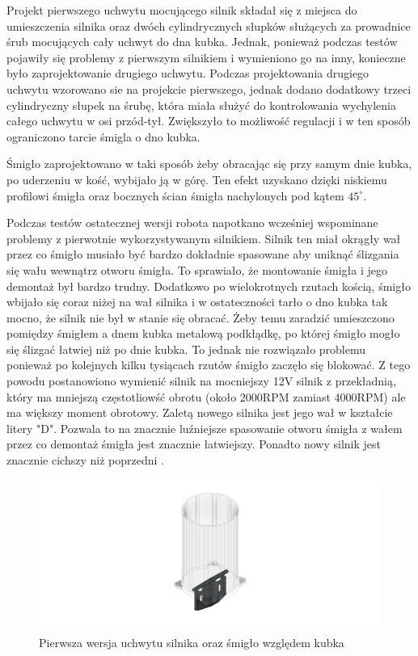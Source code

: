 Projekt pierwszego uchwytu mocującego silnik składał się z miejsca do umieszczenia silnika oraz dwóch cylindrycznych słupków służących za prowadnice
śrub mocujących cały uchwyt do dna kubka. Jednak, ponieważ podczas testów pojawiły się problemy z pierwszym silnikiem i wymieniono go na inny, konieczne
było zaprojektowanie drugiego uchwytu. Podczas projektowania drugiego uchwytu wzorowano sie na projekcie pierwszego, jednak dodano dodatkowy trzeci
cylindryczny słupek na śrubę, która miała służyć do kontrolowania wychylenia całego uchwytu w osi przód-tył. Zwiększyło to możliwość regulacji i w ten sposób
ograniczono tarcie śmigla o dno kubka. 

Śmigło zaprojektowano w taki sposób żeby obracając się przy samym dnie kubka, po uderzeniu w kość, wybijało ją w górę. Ten efekt uzyskano
dzięki niskiemu profilowi śmigła oraz bocznych ścian śmigła nachylonych pod kątem $45^{\circ}$.

Podczas testów ostatecznej wersji robota napotkano wcześniej wspominane problemy z pierwotnie wykorzystywanym silnikiem. Silnik ten miał okrągły wał przez co śmigło musiało
być bardzo dokładnie spasowane aby uniknąć ślizgania się wału wewnątrz otworu śmigła. To sprawiało, że montowanie śmigła i jego demontaż był bardzo trudny. Dodatkowo po wielokrotnych rzutach kością, śmigło
wbijało się coraz niżej na wał silnika i w ostateczności tarło o dno kubka tak mocno, że silnik nie był w stanie się obracać. 
Żeby temu zaradzić umieszczono pomiędzy śmigłem a dnem kubka metalową podkłądkę, po której śmigło mogło się ślizgać łatwiej niż po dnie kubka. To
jednak nie rozwiązało problemu ponieważ po kolejnych kilku tysiącach rzutów śmigło zaczęło się blokować. 
Z tego powodu postanowiono wymienić silnik na mocniejszy 12V silnik z przekładnią, który ma mniejszą częstotliowść obrotu (około 2000RPM zamiast 4000RPM) ale ma większy moment obrotowy.
Zaletą nowego silnika jest jego wał w kształcie litery "D". Pozwala to na znacznie luźniejsze spasowanie otworu śmigła z wałem przez co 
demontaż śmigła jest znacznie łatwiejszy. Ponadto nowy silnik jest znacznie cichszy niż poprzedni .

\begin{figure}[H]
    \centering
    \includegraphics[width=0.95\linewidth]{chapters/03-praca-wlasna/figures/uchwyt_v1.png}
    \caption{\label{fig:uchwyt_v1}Pierwsza wersja uchwytu silnika oraz śmigło względem kubka}
\end{figure}

